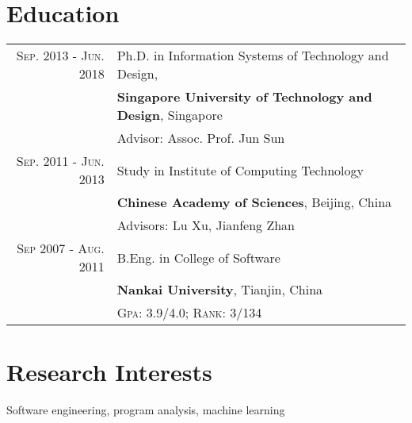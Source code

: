 \documentclass[a4paper,10pt]{article}
\begin{document}
\section{Education}
\begin{tabular}{rl}	
 \textsc{Sep.} 2013 - \textsc{Jun.} 2018  & Ph.D. in {Information Systems of Technology and Design}, \\
& \textbf{Singapore University of Technology and Design}, Singapore\\
& \small Advisor: Assoc. Prof. Jun Sun\\

\textsc{Sep.} 2011 - \textsc{Jun.} 2013& Study in 
{Institute of Computing Technology}\\
& \textbf{Chinese Academy of Sciences}, Beijing, China\\
& \small Advisors: Lu Xu, Jianfeng Zhan\\


\textsc{Sep} 2007 - \textsc{Aug.} 2011& B.Eng. in {College of Software} \\
& \textbf{Nankai University}, Tianjin, China\\
&\normalsize \textsc{Gpa}: 3.9/4.0; \textsc{Rank}: 3/134 
\end{tabular}

\section{Research Interests}
Software engineering, program analysis, machine learning
\end{document}
